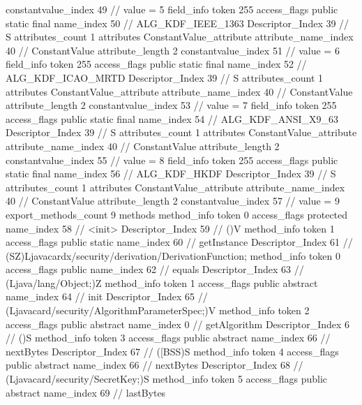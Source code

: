{{{{{{{					constantvalue_index	49		// value = 5
				}
				}
			}
			field_info {
				token	255
				access_flags	public static final
				name_index	50		// ALG_KDF_IEEE_1363
				Descriptor_Index	39		// S
				attributes_count	1
				attributes {
				ConstantValue_attribute {
					attribute_name_index	40		// ConstantValue
					attribute_length	2
					constantvalue_index	51		// value = 6
				}
				}
			}
			field_info {
				token	255
				access_flags	public static final
				name_index	52		// ALG_KDF_ICAO_MRTD
				Descriptor_Index	39		// S
				attributes_count	1
				attributes {
				ConstantValue_attribute {
					attribute_name_index	40		// ConstantValue
					attribute_length	2
					constantvalue_index	53		// value = 7
				}
				}
			}
			field_info {
				token	255
				access_flags	public static final
				name_index	54		// ALG_KDF_ANSI_X9_63
				Descriptor_Index	39		// S
				attributes_count	1
				attributes {
				ConstantValue_attribute {
					attribute_name_index	40		// ConstantValue
					attribute_length	2
					constantvalue_index	55		// value = 8
				}
				}
			}
			field_info {
				token	255
				access_flags	public static final
				name_index	56		// ALG_KDF_HKDF
				Descriptor_Index	39		// S
				attributes_count	1
				attributes {
				ConstantValue_attribute {
					attribute_name_index	40		// ConstantValue
					attribute_length	2
					constantvalue_index	57		// value = 9
				}
				}
			}
			}
			export_methods_count	9
			methods {
				method_info {
					token	0
					access_flags	protected
					name_index	58		// <init>
					Descriptor_Index	59		// ()V
				}
				method_info {
					token	1
					access_flags	public static
					name_index	60		// getInstance
					Descriptor_Index	61		// (SZ)Ljavacardx/security/derivation/DerivationFunction;
				}
				method_info {
					token	0
					access_flags	public
					name_index	62		// equals
					Descriptor_Index	63		// (Ljava/lang/Object;)Z
				}
				method_info {
					token	1
					access_flags	public abstract
					name_index	64		// init
					Descriptor_Index	65		// (Ljavacard/security/AlgorithmParameterSpec;)V
				}
				method_info {
					token	2
					access_flags	public abstract
					name_index	0		// getAlgorithm
					Descriptor_Index	6		// ()S
				}
				method_info {
					token	3
					access_flags	public abstract
					name_index	66		// nextBytes
					Descriptor_Index	67		// ([BSS)S
				}
				method_info {
					token	4
					access_flags	public abstract
					name_index	66		// nextBytes
					Descriptor_Index	68		// (Ljavacard/security/SecretKey;)S
				}
				method_info {
					token	5
					access_flags	public abstract
					name_index	69		// lastBytes
}}}}}
